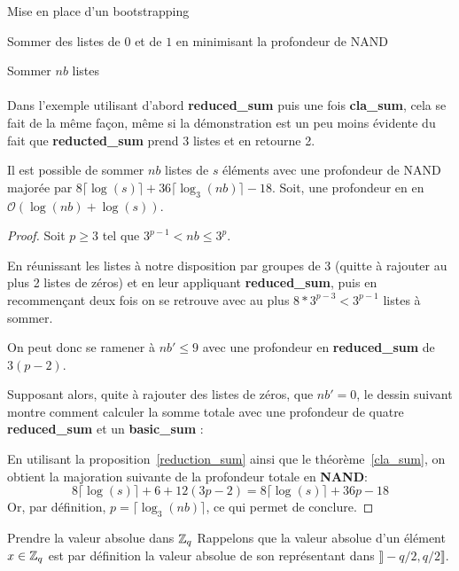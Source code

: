 \begin{section}{Mise en place d'un bootstrapping}
\begin{subsection}{Sommer des listes de $0$ et de $1$ en minimisant la profondeur de NAND}
\begin{subsubsection}{Sommer $nb$ listes}
\paragraph{}
Dans l'exemple utilisant d'abord \textbf{reduced\_sum} puis une fois \textbf{cla\_sum}, 
cela se fait de la même façon, même si la démonstration est un peu moins évidente du fait que
\textbf{reducted\_sum} prend 3 listes et en retourne 2.

\begin{prop}
\label{sum_list}
Il est possible de sommer $nb$ listes de $s$ éléments avec une profondeur de NAND majorée par 
$8 \lceil \log(s) \rceil + 36\lceil\log_3(nb)\rceil -18$. Soit, une profondeur en 
en $\mathcal{O}(\log(nb) + \log(s))$.
\end{prop}

\begin{proof}
Soit $p \geqslant 3$ tel que $3^{p-1} < nb \leqslant 3^{p}$.

En réunissant les listes à notre disposition par groupes de 3 (quitte à rajouter au plus 2 listes de zéros) et en leur appliquant \textbf{reduced\_sum}, puis
en recommençant deux fois on se retrouve avec au plus \mbox{$8 * 3^{p-3} < 3^{p-1}$} listes à sommer.

On peut donc se ramener à $nb' \leqslant 9$ avec une profondeur en \textbf{reduced\_sum} de $3(p - 2)$.

Supposant alors, quite à rajouter des listes de zéros, que  $nb' = 0$, le dessin suivant montre comment calculer
la somme totale avec une profondeur de quatre \textbf{reduced\_sum} et un \textbf{basic\_sum} :

\begin{center}

\end{center}

En utilisant la proposition~\ref{reduction_sum} ainsi que le théorème~\ref{cla_sum}, on obtient la majoration suivante
de la profondeur totale en \textbf{NAND}:
\[ 8 \lceil \log(s)\rceil + 6+ 12(3p - 2) = 8 \lceil \log(s) \rceil + 36p -18\]
Or, par définition, $p = \lceil \log_3(nb) \rceil$, ce qui permet de conclure.
\end{proof}

\end{subsubsection}
\end{subsection}
\begin{subsection}{Prendre la valeur absolue dans $\mathbb{Z}_q$}
	Rappelons que la valeur absolue d'un élément $x\in \mathbb{Z}_q$ est par définition la valeur absolue de son représentant dans $\rrbracket -q/2, q/2\rrbracket$. 
	

\end{subsection}
\end{section}
